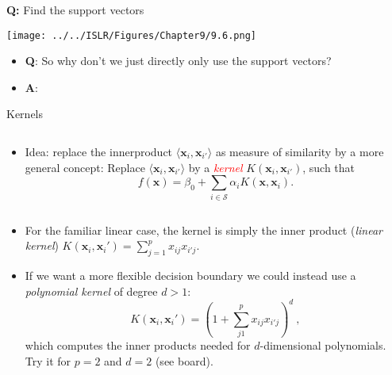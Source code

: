 \documentclass[10pt,ignorenonframetext,]{beamer}
\providecommand{\tightlist}{%
  \setlength{\itemsep}{0pt}\setlength{\parskip}{0pt}}
\begin{document}
\begin{frame}

\textbf{Q:} Find the support vectors

\texttt{[image: ../../ISLR/Figures/Chapter9/9.6.png]}

\begin{itemize}
\tightlist
\item
  \textbf{Q}: So why don't we just directly only use the support
  vectors?
\item
  \textbf{A}: 
\end{itemize}

\end{frame}

\begin{frame}

\begin{block}{Kernels}

\(~\)

\begin{itemize}
\tightlist
\item
  Idea: replace the innerproduct
  \(\langle {\boldsymbol x}_i, {\boldsymbol x}_{i'}\rangle\) as measure
  of similarity by a more general concept: Replace
  \(\langle {\boldsymbol x}_i, {\boldsymbol x}_{i'}\rangle\) by a
  \emph{\textcolor{red}{kernel}}
  \(K({\boldsymbol x}_i,{\boldsymbol x}_{i'})\), such that \[
  f({\boldsymbol x})=\beta_0 + \sum_{i \in \mathcal{S}} \alpha_i K({\boldsymbol x},{\boldsymbol x}_i).
  \]
\end{itemize}

\(~\)

\begin{itemize}
\tightlist
\item
  For the familiar linear case, the kernel is simply the inner product
  (\emph{linear kernel})
  \(K({\boldsymbol x}_i,{\boldsymbol x}_i')=\sum_{j=1}^p x_{ij}x_{i'j}\).
\end{itemize}

\begin{itemize}
\tightlist
\item
  If we want a more flexible decision boundary we could instead use a
  \emph{polynomial kernel} of degree \(d>1\): \[
  K({\boldsymbol x}_i,{\boldsymbol x}_i')=(1+\sum_{j1}^p x_{ij} x_{i'j})^d \ , 
  \] which computes the inner products needed for \(d\)-dimensional
  polynomials. Try it for \(p=2\) and \(d=2\) (see board).
\end{itemize}

\end{block}

\end{frame}
\end{document}
